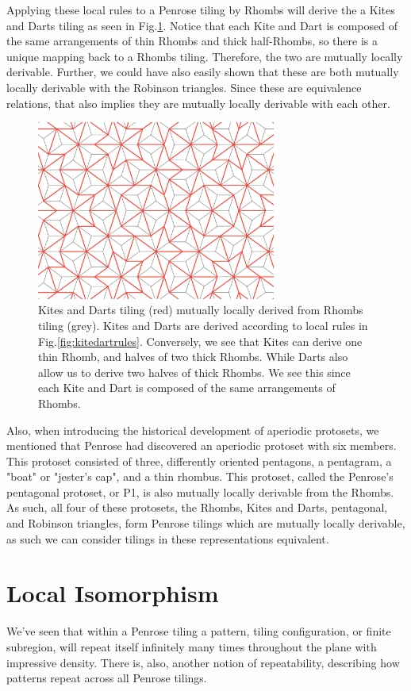 \documentclass[
  oneside,
  11pt, a4paper,
  footinclude=true,
  headinclude=true,
  cleardoublepage=empty
]{scrbook}
\begin{document}
Applying these local rules to a Penrose tiling by Rhombs will derive the a Kites and Darts tiling as seen in Fig.\ref{fig:KiteRules}. Notice that each Kite and Dart is composed of the same arrangements of thin Rhombs and thick half-Rhombs, so there is a unique mapping back to a Rhombs tiling. Therefore, the two are mutually locally derivable. Further, we could have also easily shown that these are both mutually locally derivable with the Robinson triangles. Since these are equivalence relations, that also implies they are mutually locally derivable with each other.

\begin{figure}
\centering
\includegraphics[width=0.7\textwidth]{KiteRules}
\caption{Kites and Darts tiling (red) mutually locally derived from Rhombs tiling (grey). Kites and Darts are derived according to local rules in Fig.\ref{fig:kitedartrules}. Conversely, we see that Kites can derive one thin Rhomb, and halves of two thick Rhombs. While Darts also allow us to derive two halves of thick Rhombs. We see this since each Kite and Dart is composed of the same arrangements of Rhombs.}
\label{fig:KiteRules}
\end{figure}

Also, when introducing the historical development of aperiodic protosets, we mentioned that Penrose had discovered an aperiodic protoset with six members. This protoset consisted of three, differently oriented pentagons, a pentagram, a "boat" or "jester's cap", and a thin rhombus. This protoset, called the Penrose's pentagonal protoset, or P1, is also mutually locally derivable from the Rhombs. As such, all four of these protosets, the Rhombs, Kites and Darts, pentagonal, and Robinson triangles, form Penrose tilings which are mutually locally derivable, as such we can consider tilings in these representations equivalent. 
\section{Local Isomorphism}
 We've seen that within a Penrose tiling a pattern, tiling configuration, or finite subregion, will repeat itself infinitely many times throughout the plane with impressive density. There is, also, another notion of repeatability, describing how patterns repeat across all Penrose tilings.
 
\end{document}
